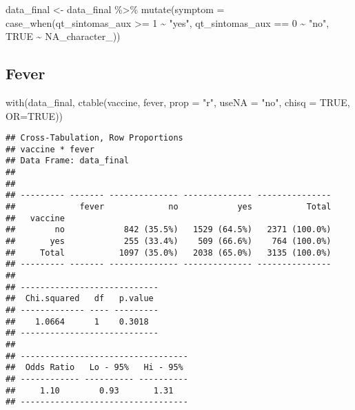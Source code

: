 \documentclass[
]{article}
\newenvironment{Shaded}{\begin{snugshade}}{\end{snugshade}}
\newcommand{\AttributeTok}[1]{\textcolor[rgb]{0.77,0.63,0.00}{#1}}
\newcommand{\ConstantTok}[1]{\textcolor[rgb]{0.00,0.00,0.00}{#1}}
\newcommand{\DecValTok}[1]{\textcolor[rgb]{0.00,0.00,0.81}{#1}}
\newcommand{\FunctionTok}[1]{\textcolor[rgb]{0.00,0.00,0.00}{#1}}
\newcommand{\NormalTok}[1]{#1}
\newcommand{\OtherTok}[1]{\textcolor[rgb]{0.56,0.35,0.01}{#1}}
\newcommand{\SpecialCharTok}[1]{\textcolor[rgb]{0.00,0.00,0.00}{#1}}
\newcommand{\StringTok}[1]{\textcolor[rgb]{0.31,0.60,0.02}{#1}}
\begin{document}
\begin{Shaded}
\begin{Highlighting}[]
\NormalTok{data\_final }\OtherTok{\textless{}{-}}\NormalTok{  data\_final }\SpecialCharTok{\%\textgreater{}\%}
  \FunctionTok{mutate}\NormalTok{(}\AttributeTok{symptom =} \FunctionTok{case\_when}\NormalTok{(qt\_sintomas\_aux }\SpecialCharTok{\textgreater{}=} \DecValTok{1} \SpecialCharTok{\textasciitilde{}} \StringTok{"yes"}\NormalTok{,}
\NormalTok{                             qt\_sintomas\_aux }\SpecialCharTok{==} \DecValTok{0} \SpecialCharTok{\textasciitilde{}} \StringTok{"no"}\NormalTok{,}
                             \ConstantTok{TRUE} \SpecialCharTok{\textasciitilde{}} \ConstantTok{NA\_character\_}\NormalTok{))}
\end{Highlighting}
\end{Shaded}

\hypertarget{fever}{%
\subsection{Fever}\label{fever}}

\begin{Shaded}
\begin{Highlighting}[]
\FunctionTok{with}\NormalTok{(data\_final, }\FunctionTok{ctable}\NormalTok{(vaccine, fever, }\AttributeTok{prop =} \StringTok{"r"}\NormalTok{, }\AttributeTok{useNA =} \StringTok{"no"}\NormalTok{, }\AttributeTok{chisq =} \ConstantTok{TRUE}\NormalTok{, }\AttributeTok{OR=}\ConstantTok{TRUE}\NormalTok{))}
\end{Highlighting}
\end{Shaded}

\begin{verbatim}
## Cross-Tabulation, Row Proportions  
## vaccine * fever  
## Data Frame: data_final  
## 
## 
## --------- ------- -------------- -------------- ---------------
##             fever             no            yes           Total
##   vaccine                                                      
##        no            842 (35.5%)   1529 (64.5%)   2371 (100.0%)
##       yes            255 (33.4%)    509 (66.6%)    764 (100.0%)
##     Total           1097 (35.0%)   2038 (65.0%)   3135 (100.0%)
## --------- ------- -------------- -------------- ---------------
## 
## ----------------------------
##  Chi.squared   df   p.value 
## ------------- ---- ---------
##    1.0664      1    0.3018  
## ----------------------------
## 
## ----------------------------------
##  Odds Ratio   Lo - 95%   Hi - 95% 
## ------------ ---------- ----------
##     1.10        0.93       1.31   
## ----------------------------------
\end{verbatim}
\end{document}
